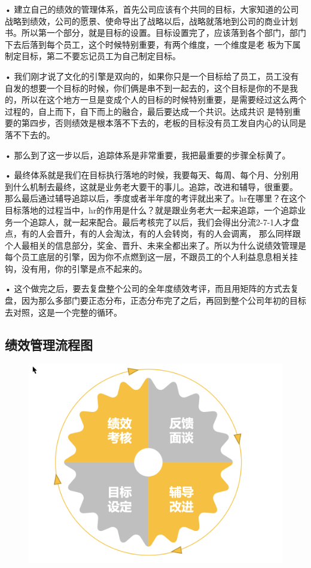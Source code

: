 \documentclass[12pt]{article}
\begin{document}
• 建立自己的绩效的管理体系，首先公司应该有个共同的目标，大家知道的公司战略到绩效，公司的愿景、使命导出了战略以后，战略就落地到公司的商业计划书。所以第一个部分，就是目标的设置。目标设置完了，应该落到各个部门，部门下去后落到每个员工，这个时候特别重要，有两个维度，一个维度是老 板为下属制定目标，第二不要忘记员工为自己制定目标。

• 我们刚才说了文化的引擎是双向的，如果你只是一个目标给了员工，员工没有自发的想要一个目标的时候，你们俩是串不到一起去的，这个目标是你的不是我的，所以在这个地方一旦是变成个人的目标的时候特别重要，是需要经过这么两个过程的，自上而下，自下而上的融合，最后要达成一个共识。达成共识 是特别重要的第四步，否则绩效是根本落不下去的，老板的目标没有员工发自内心的认同是落不下去的。

• 那么到了这一步以后，追踪体系是非常重要，我把最重要的步骤全标黄了。

• 最终体系就是我们在目标执行落地的时候，我要每天、每周、每个月、分别用到什么机制去最终，这就是业务老大要干的事儿。追踪，改进和辅导，很重要。 那么最后通过辅导追踪以后，季度或者半年度的考评就出来了。hr在哪里？在这个目标落地的过程当中，hr的作用是什么？就是跟业务老大一起来追踪，一个追踪业务一个追踪人，就一起来配合。最后考核完了以后，我们会得出分流2-7-1人才盘点，有的人会晋升，有的人会淘汰，有的人会转岗，有的人会调离， 那么同样跟个人最相关的信息部分，奖金、晋升、未来全都出来了。所以为什么说绩效管理是每个员工底层的引擎，因为你不点燃到这一层，不跟员工的个人利益息息相关挂钩，没有用，你的引擎是点不起来的。

• 这个做完之后，要去复盘整个公司的全年度绩效考评，而且用矩阵的方式去复盘，因为那么多部门要正态分布，正态分布完了之后，再回到整个公司年初的目标去对照，这是一个完整的循环。

\subsection{绩效管理流程图}
\begin{figure}[H]
    \centering
    \includegraphics[width=.6\textwidth]{fig/Ali_Performance_4.png}
\end{figure}
\end{document}
